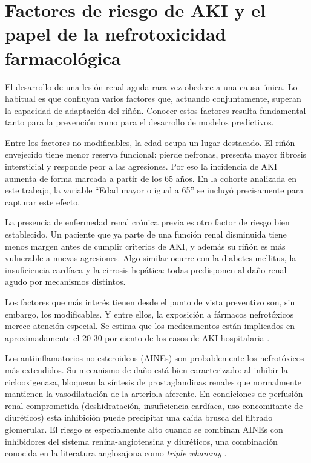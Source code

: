 \documentclass[12pt, a4paper, oneside]{report}
\begin{document}
\section{Factores de riesgo de AKI y el papel de la nefrotoxicidad farmacológica}

El desarrollo de una lesión renal aguda rara vez obedece a una causa única. Lo habitual es que confluyan varios factores que, actuando conjuntamente, superan la capacidad de adaptación del riñón. Conocer estos factores resulta fundamental tanto para la prevención como para el desarrollo de modelos predictivos.

Entre los factores no modificables, la edad ocupa un lugar destacado. El riñón envejecido tiene menor reserva funcional: pierde nefronas, presenta mayor fibrosis intersticial y responde peor a las agresiones. Por eso la incidencia de AKI aumenta de forma marcada a partir de los 65 años. En la cohorte analizada en este trabajo, la variable ``Edad mayor o igual a 65'' se incluyó precisamente para capturar este efecto.

La presencia de enfermedad renal crónica previa es otro factor de riesgo bien establecido. Un paciente que ya parte de una función renal disminuida tiene menos margen antes de cumplir criterios de AKI, y además su riñón es más vulnerable a nuevas agresiones. Algo similar ocurre con la diabetes mellitus, la insuficiencia cardíaca y la cirrosis hepática: todas predisponen al daño renal agudo por mecanismos distintos.

Los factores que más interés tienen desde el punto de vista preventivo son, sin embargo, los modificables. Y entre ellos, la exposición a fármacos nefrotóxicos merece atención especial. Se estima que los medicamentos están implicados en aproximadamente el 20-30 por ciento de los casos de AKI hospitalaria \parencite{perazella2019drug}.

Los antiinflamatorios no esteroideos (AINEs) son probablemente los nefrotóxicos más extendidos. Su mecanismo de daño está bien caracterizado: al inhibir la ciclooxigenasa, bloquean la síntesis de prostaglandinas renales que normalmente mantienen la vasodilatación de la arteriola aferente. En condiciones de perfusión renal comprometida (deshidratación, insuficiencia cardíaca, uso concomitante de diuréticos) esta inhibición puede precipitar una caída brusca del filtrado glomerular. El riesgo es especialmente alto cuando se combinan AINEs con inhibidores del sistema renina-angiotensina y diuréticos, una combinación conocida en la literatura anglosajona como \textit{triple whammy} \parencite{zhang2017nsaid}.
\end{document}

